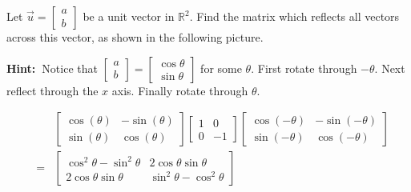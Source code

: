 \documentclass{ximera}
\begin{document}
\begin{problem}\label{prb:6.26} Let $\vec{u}=\left[
\begin{array}{r}
a \\
b
\end{array}
\right] $ be a unit vector in $\mathbb{R}^{2}.$ Find the matrix
 which reflects all vectors across
this vector, as shown in the following picture.

\begin{center}
\end{center}


\textbf{Hint:\ }Notice that $\left[
\begin{array}{r}
a \\
b
\end{array}
\right] =\left[
\begin{array}{c}
\cos \theta  \\
\sin \theta
\end{array}
\right] $ for some $\theta .$ First rotate through $-\theta .$ Next reflect through the $x$ axis. Finally rotate
through $\theta $.
\begin{hint}
\begin{eqnarray*}
&&\left[
\begin{array}{cc}
\cos \left( \theta \right) & -\sin \left( \theta \right) \\
\sin \left( \theta \right) & \cos \left( \theta \right)
\end{array}
\right] \left[
\begin{array}{rr}
1 & 0 \\
0 & -1
\end{array}
\right] \left[
\begin{array}{cc}
\cos \left( -\theta \right) & -\sin \left( -\theta \right) \\
\sin \left( -\theta \right) & \cos \left( -\theta \right)
\end{array}
\right] \\
&=& \left[
\begin{array}{cc}
\cos ^{2}\theta -\sin ^{2}\theta & 2\cos \theta \sin \theta \\
2\cos \theta \sin \theta & \sin ^{2}\theta -\cos ^{2}\theta%
\end{array}
\right]
\end{eqnarray*}

\end{hint}
\end{problem}
\end{document}

